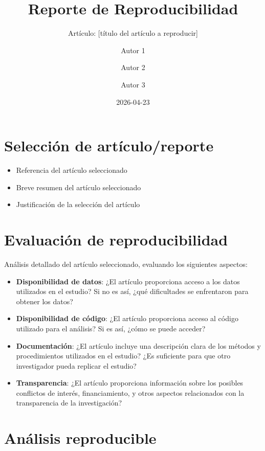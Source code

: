 \documentclass[
  spanish,
  13pt,
  letterpaper,
  DIV=11,
  numbers=noendperiod]{scrartcl}
\title{Reporte de Reproducibilidad}
\subtitle{Artículo: {[}título del artículo a reproducir{]}}
\author{Autor 1 \and Autor 2 \and Autor 3}
\date{2026-04-23}
\providecommand{\tightlist}{%
  \setlength{\itemsep}{0pt}\setlength{\parskip}{0pt}}
\renewcommand*\contentsname{Tabla de contenidos}
\newcommand\contentsname{Tabla de contenidos}
\begin{document}
\maketitle

\renewcommand*\contentsname{Tabla de contenidos}
{
\setcounter{tocdepth}{3}
\tableofcontents
}

\section{Selección de
artículo/reporte}\label{selecciuxf3n-de-artuxedculoreporte}

\begin{itemize}
\tightlist
\item
  Referencia del artículo seleccionado
\item
  Breve resumen del artículo seleccionado
\item
  Justificación de la selección del artículo
\end{itemize}

\section{Evaluación de
reproducibilidad}\label{evaluaciuxf3n-de-reproducibilidad}

Análisis detallado del artículo seleccionado, evaluando los siguientes
aspectos:

\begin{itemize}
\tightlist
\item
  \textbf{Disponibilidad de datos}: ¿El artículo proporciona acceso a
  los datos utilizados en el estudio? Si no es así, ¿qué dificultades se
  enfrentaron para obtener los datos?
\item
  \textbf{Disponibilidad de código}: ¿El artículo proporciona acceso al
  código utilizado para el análisis? Si es así, ¿cómo se puede acceder?
\item
  \textbf{Documentación}: ¿El artículo incluye una descripción clara de
  los métodos y procedimientos utilizados en el estudio? ¿Es suficiente
  para que otro investigador pueda replicar el estudio?
\item
  \textbf{Transparencia}: ¿El artículo proporciona información sobre los
  posibles conflictos de interés, financiamiento, y otros aspectos
  relacionados con la transparencia de la investigación?
\end{itemize}

\section{Análisis reproducible}\label{anuxe1lisis-reproducible}
\end{document}
